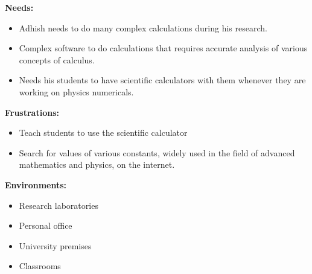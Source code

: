 \documentclass{article}
\begin{document}
\justifying
\noindent
\textbf{Needs:}
\begin{itemize}
\item Adhish needs to do many complex calculations during his research.
\item Complex software to do calculations that requires accurate analysis of various concepts of calculus.
\item  Needs his students to have scientific calculators with them whenever they are working on physics numericals. \hfill\break
\end{itemize}
\justifying
\noindent   
\textbf{Frustrations:}   
\begin{itemize}
\item Teach students to use the scientific calculator
\item Search for values of various constants, widely used in the field of advanced mathematics and physics, on the internet. \hfill\break
\end{itemize}

\justifying
\noindent
\textbf{Environments:}
\begin{itemize}
\item Research laboratories
\item Personal office
\item University premises
\item Classrooms
\end{itemize}

\hfill\break
\end{document}
